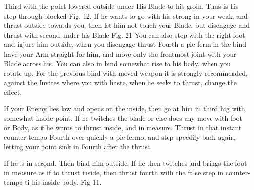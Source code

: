 \newpage


\newpage



Third with the point lowered outside under His Blade to his
groin. Thus is his step-through blocked Fig. 12. If he wants to go
with his strong in your weak, and thrust outside towards you, then let
him not touch your Blade, but disengage and thrust with second under
his Blade Fig. 21 You can also step with the right foot and injure him
outside, when you disengage thrust Fourth a pie ferm in the bind
have your Arm straight for him, and move only the frontmost joint with
your Blade across
his. You can also in bind somewhat rise to his body, when you rotate
up. For the previous bind with moved weapon it is strongly
recommended, against the Invites where you with haste, when he seeks
to thrust, change the effect.

\exercise{}


If your Enemy lies low and opens on the inside, then go at him in
third hig with somewhat inside point. If he twitches the blade or else
does any move with foot or Body, as if he wants to thrust inside, and
in measure. Thrust in that instant counter-tempo Fourth over quickly a
pie fermo, and step speedily back again, letting your point sink in
Fourth after the thrust.

\exercise{}


If he is in second. Then bind him outside. If he then twitches and
brings the foot in measure as if to thrust inside, then thrust fourth
with the false step in counter-tempo ti his inside body. Fig 11.
